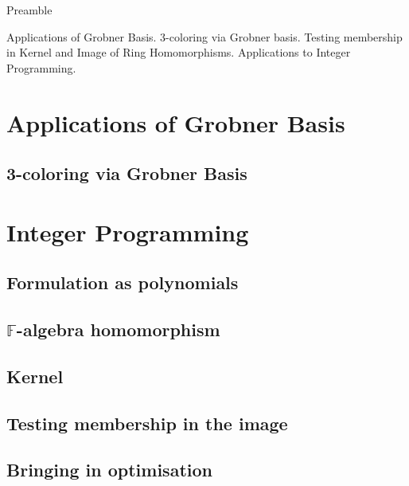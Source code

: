 
\noindent
Preamble

Applications of Grobner Basis. 3-coloring via Grobner basis. Testing membership in Kernel and Image of Ring Homomorphisms. Applications to Integer Programming.


\section{Applications of Grobner Basis}

\subsection{3-coloring via Grobner Basis}

\section{Integer Programming}
\subsection{Formulation as polynomials}
\subsection{$\mathbb{F}$-algebra homomorphism}
\subsection{Kernel}
\subsection{Testing membership in the image}
\subsection{Bringing in optimisation}

